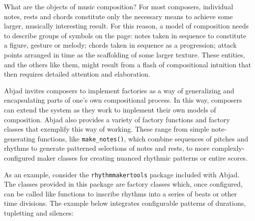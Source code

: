 \documentclass{article}
\begin{document}
What are the objects of music composition? For most composers, individual
notes, rests and chords constitute  only the necessary means to achieve some
larger, musically interesting result. For this reason, a model of composition
needs to describe groups of symbols on the page: notes taken in sequence to
constitute a figure, gesture or melody; chords taken in sequence as a
progression; attack points arranged in time as the scaffolding of some larger
texture. These entities, and the others like them, might result from a flash of
compositional intuition that then requires detailed attention and elaboration.

Abjad invites composers to implement factories as a way of generalizing and
encapsulating parts of one's own compositional process. In this way, composers
can extend the system as they work to implement their own models of
composition. Abjad also provides a variety of factory functions and factory
classes that exemplify this way of working. These range from simple
note-generating functions, like \texttt{make\_notes()}, which combine sequences
of pitches and rhythms to generate patterned selections of notes and rests, to
more complexly-configured maker classes for creating nuanced rhythmic patterns
or entire scores.

As an example, consider the \texttt{rhythmmakertools} package included with
Abjad. The classes provided in this package are factory classes which, once
configured, can be called like functions to inscribe rhythms into a series of
beats or other time divisions. The example below integrates configurable
patterns of durations, tupletting and silences:

\end{document}
